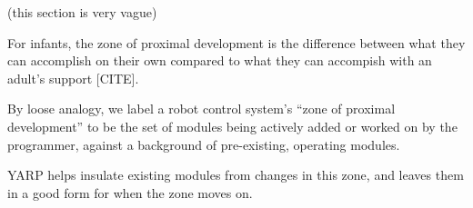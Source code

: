 (this section is very vague)

For infants, the zone of proximal development is the
difference between what they can accomplish on their
own compared to what they can accompish with an
adult's support [CITE].

By loose analogy, we label a robot control system's ``zone of proximal
development'' to be the set of modules being actively added or worked
on by the programmer, against a background of pre-existing, operating
modules.  

YARP helps insulate existing modules from changes in this zone,
and leaves them in a good form for when the zone moves on.

